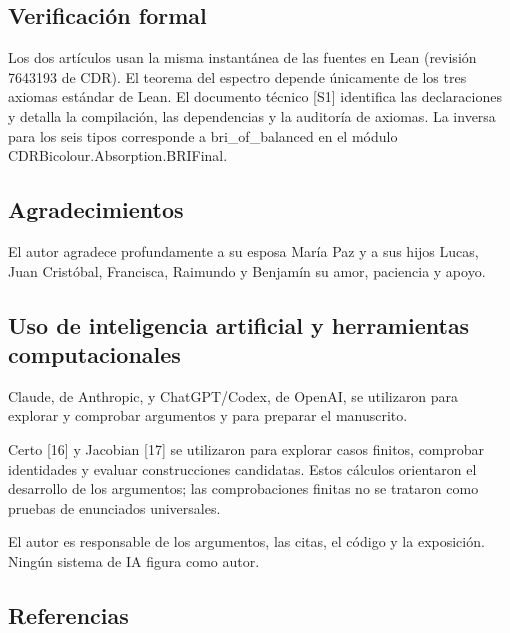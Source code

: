 \documentclass[spanish,11pt,a4paper]{article}
\begin{document}
\subsection{Verificación formal}\label{verificaciuxf3n-formal}

Los dos artículos usan la misma instantánea de las fuentes en Lean (revisión 7643193 de CDR). El teorema del espectro depende únicamente de los tres axiomas estándar de Lean. El documento técnico {[}S1{]} identifica las declaraciones y detalla la compilación, las dependencias y la auditoría de axiomas. La inversa para los seis tipos corresponde a bri\_of\_balanced en el módulo CDRBicolour.Absorption.BRIFinal.

\subsection{Agradecimientos}\label{agradecimientos}

El autor agradece profundamente a su esposa María Paz y a sus hijos Lucas, Juan Cristóbal, Francisca, Raimundo y Benjamín su amor, paciencia y apoyo.

\subsection{Uso de inteligencia artificial y herramientas computacionales}\label{uso-de-inteligencia-artificial-y-herramientas-computacionales}

Claude, de Anthropic, y ChatGPT/Codex, de OpenAI, se utilizaron para explorar y comprobar argumentos y para preparar el manuscrito.

Certo {[}16{]} y Jacobian {[}17{]} se utilizaron para explorar casos finitos, comprobar identidades y evaluar construcciones candidatas. Estos cálculos orientaron el desarrollo de los argumentos; las comprobaciones finitas no se trataron como pruebas de enunciados universales.

El autor es responsable de los argumentos, las citas, el código y la exposición. Ningún sistema de IA figura como autor.

\subsection{Referencias}\label{referencias}
\end{document}
